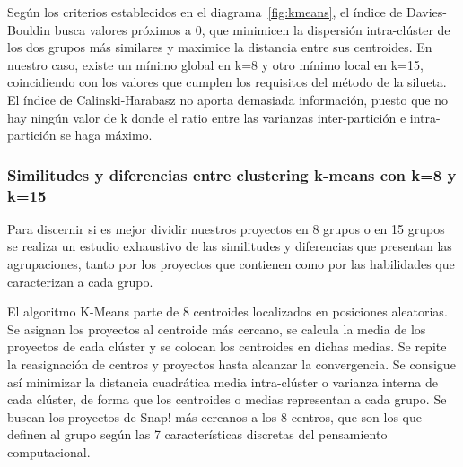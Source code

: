 \documentclass[a4paper, 12pt]{book}
\begin{document}
Según los criterios establecidos en el diagrama~\ref{fig:kmeans}, el índice de Davies-Bouldin busca valores próximos a 0, que minimicen la dispersión intra-clúster de los dos grupos más similares y maximice la distancia entre sus centroides. En nuestro caso, existe un mínimo global en k=8 y otro mínimo local en k=15, coincidiendo con los valores que cumplen los requisitos del método de la silueta. El índice de Calinski-Harabasz no aporta demasiada información, puesto que no hay ningún valor de k donde el ratio entre las varianzas inter-partición e intra-partición se haga máximo.

\subsubsection{Similitudes y diferencias entre clustering k-means con k=8 y k=15}
\label{sec:k8_k15}

Para discernir si es mejor dividir nuestros proyectos en 8 grupos o en 15 grupos se realiza un estudio exhaustivo de las similitudes y diferencias que presentan las agrupaciones, tanto por los proyectos que contienen como por las habilidades que caracterizan a cada grupo.

El algoritmo K-Means parte de 8 centroides localizados en posiciones aleatorias. Se asignan los proyectos al centroide más cercano, se calcula la media de los proyectos de cada clúster y se colocan los centroides en dichas medias. Se repite la reasignación de centros y proyectos hasta alcanzar la convergencia. Se consigue así minimizar la distancia cuadrática media intra-clúster o varianza interna de cada clúster, de forma que los centroides o medias representan a cada grupo. Se buscan los proyectos de Snap! más cercanos a los 8 centros, que son los que definen al grupo según las 7 características discretas del pensamiento computacional.
\end{document}

